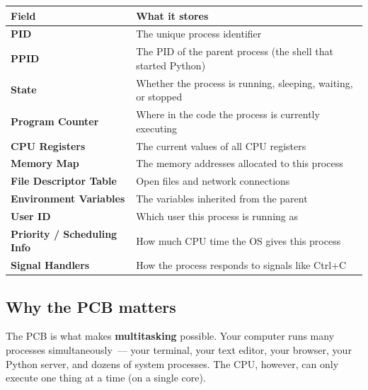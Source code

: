 {\def\LTcaptype{none} %
\begin{longtable}[]{@{}
  >{\raggedright\arraybackslash}p{}
  >{\raggedright\arraybackslash}p{}@{}}
\toprule\noalign{}
\begin{minipage}[b]{\linewidth}\raggedright
Field
\end{minipage} & \begin{minipage}[b]{\linewidth}\raggedright
What it stores
\end{minipage} \\
\midrule\noalign{}
\endhead
\bottomrule\noalign{}
\endlastfoot
\textbf{PID} & The unique process identifier \\
\textbf{PPID} & The PID of the parent process (the shell that started Python) \\
\textbf{State} & Whether the process is running, sleeping, waiting, or stopped \\
\textbf{Program Counter} & Where in the code the process is currently executing \\
\textbf{CPU Registers} & The current values of all CPU registers \\
\textbf{Memory Map} & The memory addresses allocated to this process \\
\textbf{File Descriptor Table} & Open files and network connections \\
\textbf{Environment Variables} & The variables inherited from the parent \\
\textbf{User ID} & Which user this process is running as \\
\textbf{Priority / Scheduling Info} & How much CPU time the OS gives this process \\
\textbf{Signal Handlers} & How the process responds to signals like Ctrl+C \\
\end{longtable}
}

\subsection*{Why the PCB matters}\label{01-command-to-process:why-the-pcb-matters}

The PCB is what makes \textbf{multitasking} possible. Your computer runs many processes simultaneously~--- your terminal, your text editor, your browser, your Python server, and dozens of system processes. The CPU, however, can only execute one thing at a time (on a single core).


